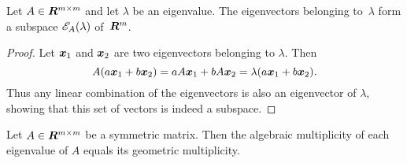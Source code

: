 \begin{lemma}\label{lemma:eigenspace}
Let $A \in \bm{R}^{m \times m}$ and let $\lambda$ be an eigenvalue. 
The eigenvectors belonging to~$\lambda$ form a subspace $\mathscr{E}_{A}(\lambda)$ 
of~$\bm{R}^m$.
\end{lemma}
\begin{proof}
Let $\boldsymbol{x}_1$ and $\boldsymbol{x}_2$ are two eigenvectors belonging to $\lambda$.
Then 
\[
    A (a \boldsymbol{x}_1 + b \boldsymbol{x}_2) = 
        a A \boldsymbol{x}_1 + b A \boldsymbol{x}_2 = 
        \lambda (a \boldsymbol{x}_1 + b \boldsymbol{x}_2).
\]
Thus any linear combination of the eigenvectors is also an eigenvector of $\lambda$,
showing that this set of vectors is indeed a subspace. 
\end{proof}

\begin{lemma}\label{lemma:alg_geom_mult}
Let $A \in \bm{R}^{m \times m}$ be a symmetric matrix. Then the algebraic multiplicity 
of each eigenvalue of $A$ equals its geometric multiplicity. 
\end{lemma}
